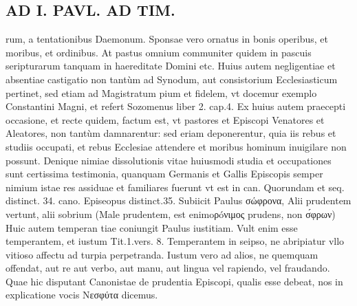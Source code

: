 \documentclass{article}
\begin{document}
\begin{pages}
\section*{AD I. PAVL. AD TIM. }
\marginpar{[ p.Ro ]}\pstart rum, a tentationibus Daemonum. Sponsae vero ornatus in bonis operibus, et moribus, et ordinibus. At pastus omnium communiter quidem in pascuis seripturarum tanquam in haereditate Domini etc.  \pend\pstart Huius autem negligentiae et absentiae castigatio non tantùm ad Synodum, aut consistorium Ecclesiasticum pertinet, sed etiam ad Magistratum pium et fidelem, vt docemur exemplo Constantini Magni, et refert Sozomenus liber  2. cap.4.  \pend\pstart Ex huius autem praecepti occasione, et recte quidem, factum est, vt pastores et Episcopi Venatores et Aleatores, non tantùm damnarentur: sed eriam deponerentur, quia iis rebus et studiis occupati, et rebus Ecclesiae attendere et moribus hominum inuigilare non possunt. Denique nimiae dissolutionis vitae huiusmodi studia et occupationes sunt certissima testimonia, quanquam Germanis et Gallis Episcopis semper nimium istae res assiduae et familiares fuerunt vt est in can. Quorundam et seq. distinct. 34. cano. Episeopus distinct.35.  \pend\pstart Subiicit Paulus σώφρονα, Alii prudentem vertunt, alii sobrium (Male prudentem, est enimoρóνιμος prudens, non σ́φρων) Huic autem temperan tiae coniungit Paulus iustitiam. Vult enim esse temperantem, et iustum Tit.1.vers. 8. Temperantem in seipso, ne abripiatur vllo vitioso affectu ad turpia perpetranda. Iustum vero ad alios, ne quemquam offendat, aut re aut verbo, aut manu, aut lingua vel rapiendo, vel fraudando. Quae hic disputant Canonistae de prudentia Episcopi, qualis esse debeat, nos in explicatione vocis Nεσφύτα dicemus.  \pend

\end{pages}
\end{document}
